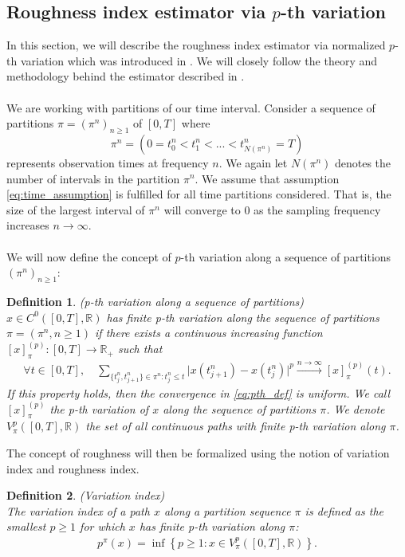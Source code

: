 \documentclass{article}
\newtheorem{definition}{Definition}
\begin{document}
\subsection{Roughness index estimator via $p$-th variation}
In this section, we will describe the roughness index estimator via normalized $p$-th variation which was introduced in \cite{cont}. We will closely follow the theory and methodology behind the estimator described in \cite{cont}.\\\\
We are working with partitions of our time interval. Consider a sequence of partitions $\pi = (\pi^n) _{n\geq 1}$ of $[0,T]$ where
\[
\pi^n = \left( 0 = t_0^n < t_1^n < ... < t^n_{N(\pi^n)}=T \right)
\]
represents observation times at frequency $n$. We again let $N(\pi^n)$ denotes the number of intervals in the partition $\pi^n$. We assume that assumption \eqref{eq:time_assumption} is fulfilled for all time partitions considered. That is, the size of the largest interval of $\pi^n$ will converge to 0 as the sampling frequency increases $n\rightarrow \infty$.\\\\
We will now define the concept of $p$-th variation along a sequence of partitions $(\pi^n) _{n\geq 1}$:
\begin{definition}
\textnormal{(p-th variation along a sequence of partitions)}\\
$x \in C^0([0,T], \mathbb{R})$ has finite p-th variation along the sequence of partitions 
$\pi = (\pi^n, n \geq 1)$ if there exists a continuous increasing function $[x]_{\pi}^{(p)}: [0,T] \to \mathbb{R}_+$ such that
\begin{align}
\forall t \in [0,T], \quad \sum_{\{t_j^n, t_{j+1}^n\} \in \pi^n: t_j^n \leq t} \lvert x(t_{j+1}^n) - x(t_j^n) \rvert^p 
{\overset{n \to \infty}\longrightarrow} [x]_{\pi}^{(p)}(t). \label{eq:pth_def}
\end{align}
If this property holds, then the convergence in \eqref{eq:pth_def} is uniform. We call $[x]_{\pi}^{(p)}$ the p-th variation of $x$ along the sequence of partitions $\pi$. We denote $V_\pi^p([0,T], \mathbb{R})$ the set of all continuous paths with finite p-th variation along $\pi$.
\label{def:pth_var}
\end{definition}
The concept of roughness will then be formalized using the notion of variation index and roughness index.
\begin{definition}
\textnormal{(Variation index)}\\
The variation index of a path $x$ along a partition sequence $\pi$ is defined as the smallest $p \geq 1$ for which $x$ has finite p-th variation along $\pi$:
\begin{align*}
p^{\pi}(x) = \inf \left\{ p \geq 1 : x \in V_{\pi}^p([0,T], \mathbb{R}) \right\}.
\end{align*}
\label{def:var_index}
\end{definition}
\end{document}
